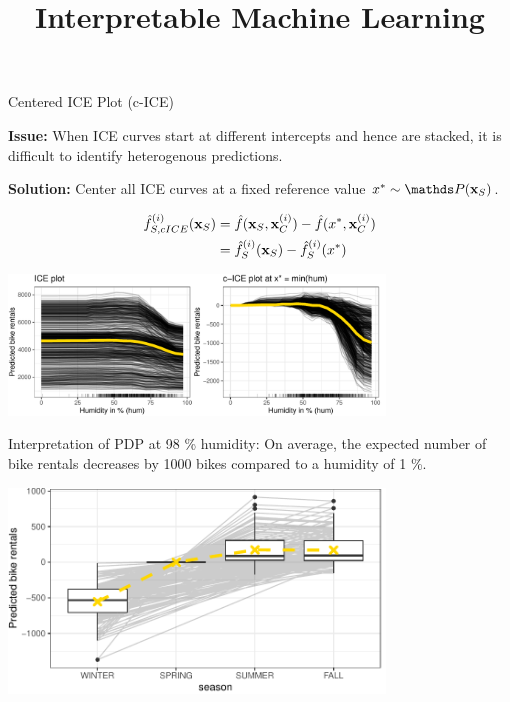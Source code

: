 \documentclass[11pt,compress,t,notes=noshow, aspectratio=169, xcolor=table]{beamer}
\title{Interpretable Machine Learning}
\date{}
\begin{document}
\newcommand{\titlefigure}{figure/pdp_bike}
\newcommand{\learninggoals}{
\item Understand c-ICE curves to identify the heterogeneity in the model
\item Understand the extrapolation issue}



\begin{frame}{Centered ICE Plot (c-ICE)}

\textbf{Issue:} When ICE curves start at different intercepts and hence are stacked, it is difficult to identify heterogenous predictions.

\textbf{Solution:} Center all ICE curves at a fixed reference value $x^* \sim \P(\xv_S)$.


$$\begin{aligned}
\fh_{S, cICE}^{(i)}(\xv_S)
&= \fh(\xv_S, \xi_C) - \fh(x^*, \xi_C) \\
&= \fh_{S}^{(i)}(\xv_S) - \fh_{S}^{(i)}(x^*)
\end{aligned}$$

\begin{center}
	\vspace{-0.3cm}
\includegraphics[width=0.75\textwidth]{figure/cICE}
\end{center}
\vspace{-0.4cm}

Interpretation of PDP at 98 \% humidity: On average, the expected number of bike rentals decreases by 1000 bikes compared to a humidity of 1 \%.

\framebreak

\begin{center}
\includegraphics[width=0.75\textwidth]{figure/cICEcat}
\end{center}


\end{frame}
\end{document}

